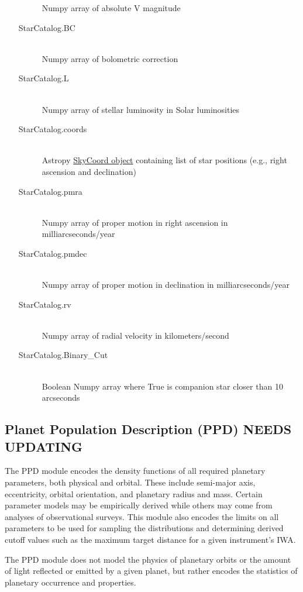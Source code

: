 \documentclass[cleanfoot]{asme2ej}
\begin{document}
\begin{itemize}
\begin{description}
        Numpy array of absolute V magnitude
        \item[StarCatalog.BC] \hfill \\
        Numpy array of bolometric correction
        \item[StarCatalog.L] \hfill \\
        Numpy array of stellar luminosity in Solar luminosities
        \item[StarCatalog.coords] \hfill \\
        Astropy \href{http://astropy.readthedocs.org/en/latest/api/astropy.coordinates.SkyCoord.html}{SkyCoord object} containing list of star positions (e.g., right ascension and declination)
        \item[StarCatalog.pmra] \hfill \\
        Numpy array of proper motion in right ascension in milliarcseconds/year
        \item[StarCatalog.pmdec] \hfill \\
        Numpy array of proper motion in declination in milliarcseconds/year
        \item[StarCatalog.rv] \hfill \\
        Numpy array of radial velocity in kilometers/second
        \item[StarCatalog.Binary\_Cut] \hfill \\
        Boolean Numpy array where True is companion star closer than 10 arcseconds
    \end{description}
\end{itemize}


\subsection{Planet Population Description (PPD) NEEDS UPDATING}
The PPD module encodes the density functions of all required planetary parameters, both physical and orbital. These include semi-major axis, eccentricity, orbital orientation, and planetary radius and mass. Certain parameter models may be empirically derived while others may come from analyses of observational surveys.  This module also encodes the limits on all parameters to be used for sampling the distributions and determining derived cutoff values such as the maximum target distance for a given instrument's IWA.

The PPD module does not model the physics of planetary orbits or the amount of light reflected or emitted by a given planet, but rather encodes the statistics of planetary occurrence and properties. 
\end{document}
